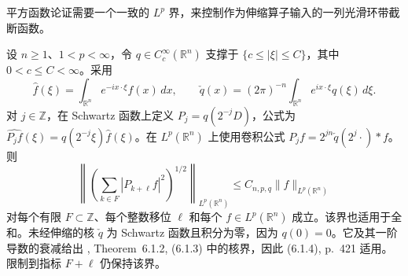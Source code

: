 平方函数论证需要一个一致的 $L^p$ 界，来控制作为伸缩算子输入的一列光滑环带截断函数。

\begin{Proposition}\label{ext:stein-annular-square}
设 $n\ge1$、$1<p<\infty$，令 $q\in C_c^\infty(\mathbb R^n)$ 支撑于 $\{c\le|\xi|\le C\}$，其中 $0<c\le C<\infty$。采用
\[
 \widehat f(\xi)=\int_{\mathbb R^n}e^{-ix\cdot\xi}f(x)\,dx,\qquad
 \check q(x)=(2\pi)^{-n}\int_{\mathbb R^n}e^{ix\cdot\xi}q(\xi)\,d\xi .
\]
对 $j\in\mathbb Z$，在 Schwartz 函数上定义 $P_j=q(2^{-j}D)$，公式为 $\widehat{P_j f}(\xi)=q(2^{-j}\xi)\widehat f(\xi)$。在 $L^p(\mathbb R^n)$ 上使用卷积公式 $P_j f=2^{jn}\check q(2^j\cdot)*f$。则
\[
 \left\|\left(\sum_{k\in F}|P_{k+\ell} f|^2\right)^{1/2}\right\|_{L^p(\mathbb R^n)}
 \le C_{n,p,q}\|f\|_{L^p(\mathbb R^n)}
\]
对每个有限 $F\subset\mathbb Z$、每个整数移位 $\ell$ 和每个 $f\in L^p(\mathbb R^n)$ 成立。该界也适用于全和。未经伸缩的核 $\check q$ 为 Schwartz 函数且积分为零，因为 $q(0)=0$。它及其一阶导数的衰减给出 \cite{r-32}, Theorem~6.1.2, (6.1.3) 中的核界，因此 (6.1.4), p.~421 适用。限制到指标 $F+\ell$ 仍保持该界。
\end{Proposition}
